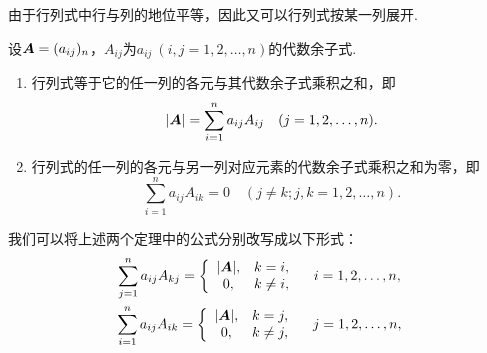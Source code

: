 由于行列式中行与列的地位平等，因此又可以行列式按某一列展开.
\begin{theorem}
设\(\boldsymbol{A}=(a_{ij})_n\)，\(A_{ij}\)为\(a_{ij}\ (i,j=1,2,\dotsc,n)\)的代数余子式.
\begin{enumerate}
	\item 行列式等于它的任一列的各元与其代数余子式乘积之和，即\begin{equation}
		\abs{\boldsymbol{A}} = \sum_{i=1}^n a_{ij} A_{ij}
		\quad(j=1,2,\dotsc,n).
	\end{equation}

	\item 行列式的任一列的各元与另一列对应元素的代数余子式乘积之和为零，即\begin{equation}
		\sum_{i=1}^n a_{ij} A_{ik} = 0
		\quad(j \neq k;
		j,k=1,2,\dotsc,n).
	\end{equation}
\end{enumerate}
\end{theorem}

我们可以将上述两个定理中的公式分别改写成以下形式：
\begin{gather}
	\sum_{j=1}^n a_{ij} A_{kj}
	= \left\{ \begin{array}{cl}
		\abs{\boldsymbol{A}}, & k = i, \\
		0, & k \neq i,
	\end{array} \right.
	\quad i=1,2,\dotsc,n, \\
	\sum_{i=1}^n a_{ij} A_{ik}
	= \left\{ \begin{array}{cl}
		\abs{\boldsymbol{A}}, & k = j, \\
		0, & k \neq j,
	\end{array} \right.
	\quad j=1,2,\dotsc,n,
\end{gather}

